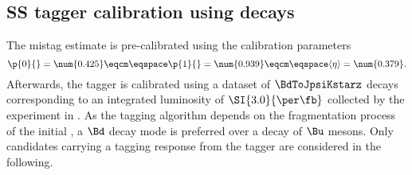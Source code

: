 \subsection[
  head={\Acs*{SS} tagger calibration using \BdToJpsiKstarz decays},
  tocentry={\Acl*{SS} tagger calibration using \BdToJpsiKstarzHyperref decays}
]{\Acl*{SS} tagger calibration using \BdToJpsiKstarzbfsf decays}
\label{sec:flavour_tagging:calibration:ss}

The \SSpi mistag estimate is pre-calibrated using the calibration parameters
%
\begin{equation}
\label{eq:tagging:sspion_precalibration}
    \p{0}{} = \num{0.425}\eqcm\eqspace
    \p{1}{} = \num{0.939}\eqcm\eqspace
    \langle\eta\rangle = \num{0.379}.
\end{equation}
%
Afterwards, the \SSpi tagger is calibrated using a dataset of $\BdToJpsiKstarz$
decays corresponding to an integrated luminosity of $\SI{3.0}{\per\fb}$
collected by the \LHCb experiment in \RunOne. As the \SSpi tagging algorithm
depends on the fragmentation process of the initial \Bmeson, a $\Bd$ decay mode
is preferred over a decay of $\Bu$ mesons. Only candidates carrying a tagging
response from the \SSpi tagger are considered in the following.


